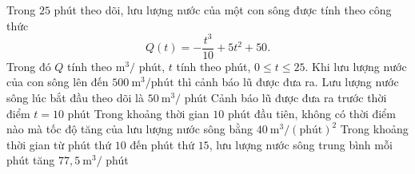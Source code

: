 \begin{ex}%
	Trong $25$ phút theo dõi, lưu lượng nước của một con sông được tính theo công thức
	$$
	Q(t)=-\dfrac{t^3}{10}+5 t^2+50.
	$$
	Trong đó $Q$ tính theo $\mathrm{m}^3/$ phút, $t$ tính theo phút, $0 \leq t \leq 25$. Khi lưu lượng nước của con sông lên đến $500 \mathrm{~m}^3 / \mathrm{phút}$ thì cảnh báo lũ được đưa ra.
	\choiceTF
	{\True Lưu lượng nước sông lúc bắt đầu theo dõi là $50 \mathrm{~m}^3 /$ phút}
	{Cảnh báo lũ được đưa ra trước thời điểm $t=10$ phút}
	{Trong khoảng thời gian $10$ phút đầu tiên, không có thời điểm nào mà tốc độ tăng của lưu lượng nước sông bằng $40 \mathrm{~m}^3/(\text{phút})^2$}
	{\True Trong khoảng thời gian từ phút thứ $10$ đến phút thứ $15$, lưu lượng nước sông trung bình mỗi phút tăng $77{,}5 \mathrm{~m}^3 /$ phút}
\end{ex}
